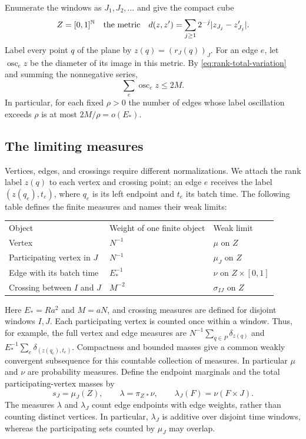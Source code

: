 Enumerate the windows as $J_1,J_2,\ldots$ and give the compact cube
\[
 Z=[0,1]^{\mathbb N}
 \quad\hbox{the metric}\quad
 d(z,z')=\sum_{j\ge1}2^{-j}|z_{J_j}-z'_{J_j}|.
\]
Label every point $q$ of the plane by $z(q)=(r_J(q))_J$.
For an edge $e$, let $\operatorname{osc}_e z$ be the diameter of its
image in this metric.  By \eqref{eq:rank-total-variation} and summing
the nonnegative series,
\[
 \sum_e\operatorname{osc}_e z\le 2M.
\]
In particular, for each fixed $\rho>0$ the number of edges whose label
oscillation exceeds $\rho$ is at most $2M/\rho=o(E_*)$.

\subsection{The limiting measures}
Vertices, edges, and crossings require different normalizations.
We attach the rank label $z(q)$ to each vertex and crossing point;
an edge $e$ receives the label $(z(q_e),t_e)$, where $q_e$ is its left
endpoint and $t_e$ its batch time. The following table defines the
finite measures and names their weak limits:
\begin{center}
\begin{tabular}{lll}
Object & Weight of one finite object & Weak limit\\[3pt]
Vertex & $N^{-1}$ & $\mu$ on $Z$\\
Participating vertex in $J$ & $N^{-1}$ & $\mu_J$ on $Z$\\
Edge with its batch time & $E_*^{-1}$ & $\nu$ on $Z\times[0,1]$\\
Crossing between $I$ and $J$ & $M^{-2}$ & $\sigma_{IJ}$ on $Z$
\end{tabular}
\end{center}
Here $E_*=Ra^2$ and $M=aN$, and crossing measures are defined for
disjoint windows $I,J$. Each participating vertex is counted once
within a window. Thus, for example, the full vertex and edge measures
are $N^{-1}\sum_{q\in P}\delta_{z(q)}$ and
$E_*^{-1}\sum_e\delta_{(z(q_e),t_e)}$.
Compactness and bounded masses give a common weakly convergent
subsequence for this countable collection of measures. In particular
$\mu$ and $\nu$ are probability measures. Define the endpoint marginals
and the total participating-vertex masses by
\[
 s_J=\mu_J(Z),\qquad
 \lambda=\pi_{Z\,*}\nu,\qquad
 \lambda_J(F)=\nu(F\times J).
\]
The measures $\lambda$ and $\lambda_J$ count edge endpoints with edge
weights, rather than counting distinct vertices. In particular,
$\lambda_J$ is additive over disjoint time windows, whereas the
participating sets counted by $\mu_J$ may overlap.
